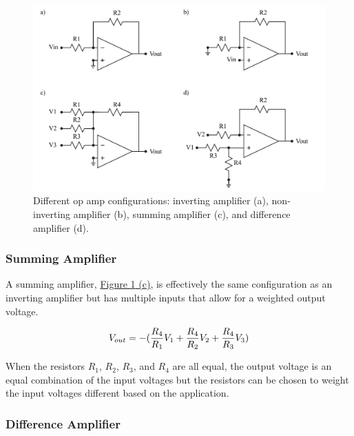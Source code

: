 \begin{figure} [h!]
	\centering
		\includegraphics[width=1\textwidth]{Lab6configs.pdf}
	\caption{Different op amp configurations: inverting amplifier (a), non-inverting amplifier (b), summing amplifier (c), and difference amplifier (d).} \label{fig:6OAconfigs}
\end{figure}

\subsubsection{Summing Amplifier}

A summing amplifier, \hyperref[fig:6OAconfigs]{Figure \ref*{fig:6OAconfigs} (c)}, is effectively the same configuration as an inverting amplifier but has multiple inputs that allow for a weighted output voltage. 

\begin{equation}
	\centering
	V_{out} = -(\frac{R_4}{R_1}V_1 + \frac{R_4}{R_2}V_2 + \frac{R_4}{R_3}V_3)
\end{equation}

\noindent When the resistors $R_1$, $R_2$, $R_3$, and $R_4$ are all equal, the output voltage is an equal combination of the input voltages but the resistors can be chosen to weight the input voltages different based on the application. 


\subsubsection{Difference Amplifier}

